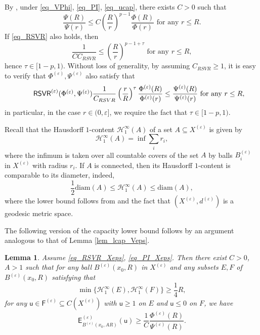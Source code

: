 \documentclass[11pt,a4paper]{article}
\numberwithin{equation}{section}
\theoremstyle{plain}
\newtheorem{lemma}[theorem]{Lemma}
\theoremstyle{definition}
\begin{document}
By \cite[Proposition 2.1]{Yan25a}, under \ref{eq_VPhi}, \ref{eq_PI}, \ref{eq_ucap}, there exists $C>0$ such that
$$\frac{\Psi(R)}{\Psi(r)}\le C \left(\frac{R}{r}\right)^{p-1}\frac{\Phi(R)}{\Phi(r)}\text{ for any }r\le R.$$
If \ref{eq_RSVR} also holds, then
$$\frac{1}{CC_{RSVR}}\le \left(\frac{R}{r}\right)^{p-1+\tau}\text{ for any }r\le R,$$
hence $\tau\in[1-p,1)$. Without loss of generality, by assuming $C_{RSVR}\ge1$, it is easy to verify that $\Phi^{(\varepsilon)}, \Psi^{(\varepsilon)}$ also satisfy that
\begin{equation*}\label{eq_RSVR_Xeps}\tag*{$\mathsf{RSVR}^{(\varepsilon)}(\Phi^{(\varepsilon)},\Psi^{(\varepsilon)})$}
\frac{1}{C_{RSVR}}\left(\frac{r}{R}\right)^{\tau}\frac{\Phi^{(\varepsilon)}(R)}{\Phi^{(\varepsilon)}(r)}\le\frac{\Psi^{(\varepsilon)}(R)}{\Psi^{(\varepsilon)}(r)}\text{ for any }r\le R,
\end{equation*}
in particular, in the case $r\in(0,\varepsilon]$, we require the fact that $\tau\in[1-p,1)$.

Recall that the Hausdorff $1$-content $\mathcal{H}_1^\infty(A)$ of a set $A\subseteq X^{(\varepsilon)}$ is given by
$$\mathcal{H}_1^{\infty}(A)=\inf\sum_{i}r_i,$$
where the infimum is taken over all countable covers of the set $A$ by balls $B^{(\varepsilon)}_i$ in $X^{(\varepsilon)}$ with radius $r_i$. If $A$ is connected, then its Hausdorff $1$-content is comparable to its diameter, indeed,
\begin{equation}\label{eq_Haus_diam}
\frac{1}{2}\mathrm{diam}(A)\le\mathcal{H}_1^\infty(A)\le\mathrm{diam}(A),
\end{equation}
where the lower bound follows from \cite[Lemma 2.6.1]{BBI01} and the fact that $(X^{(\varepsilon)},d^{(\varepsilon)})$ is a geodesic metric space.

The following version of the capacity lower bound follows by an argument analogous to that of Lemma \ref{lem_lcap_Veps}.

\begin{lemma}\label{lem_lcap_Xeps}
Assume \ref{eq_RSVR_Xeps}, \ref{eq_PI_Xeps}. Then there exist $C>0$, $A>1$ such that for any ball $B^{(\varepsilon)}(x_0,R)$ in $X^{(\varepsilon)}$ and any subsets $E,F$ of $B^{(\varepsilon)}(x_0,R)$ satisfying that
$$\min\{\mathcal{H}_1^\infty(E),\mathcal{H}_1^\infty(F)\}\ge \frac{1}{4}R,$$
for any $\mathsf{u}\in\mathsf{F}^{(\varepsilon)}\subseteq C(X^{(\varepsilon)})$ with $\mathsf{u}\ge1$ on $E$ and $\mathsf{u}\le0$ on $F$, we have
$$\mathsf{E}^{(\varepsilon)}_{B^{(\varepsilon)}(x_0,AR)}(\mathsf{u})\ge \frac{1}{C}\frac{\Phi^{(\varepsilon)}(R)}{\Psi^{(\varepsilon)}(R)}.$$
\end{lemma}
\end{document}
